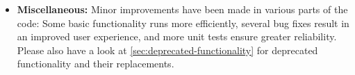 \begin{itemize}
	\item \textbf{Miscellaneous:}
 		Minor improvements have been made in various parts of the code:
		Some basic functionality runs more efficiently,
		several bug fixes result in an improved user experience,
		and more unit tests ensure greater reliability.
		Please also have a look at \cref{sec:deprecated-functionality} for deprecated functionality and their replacements.


\end{itemize}
